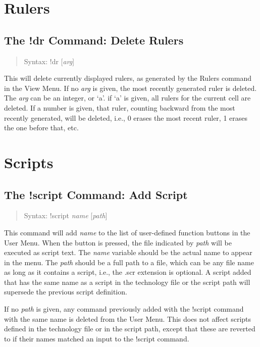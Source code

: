 \section{Rulers}

\subsection{The {\cb !dr} Command: Delete Rulers}
\begin{quote}
Syntax: {\vt !dr} [{\it arg\/}]
\end{quote}
This will delete currently displayed rulers, as generated by the {\cb
Rulers} command in the {\cb View Menu}.  If no {\it arg} is given, the
most recently generated ruler is deleted.  The {\it arg} can be an
integer, or `{\vt a}'.  if `{\vt a}' is given, all rulers for the
current cell are deleted.  If a number is given, that ruler, counting
backward from the most recently generated, will be deleted, i.e., 0
erases the most recent ruler, 1 erases the one before that, etc.


\section{Scripts}

\subsection{The {\cb !script} Command: Add Script}
\begin{quote}
Syntax: {\vt !script} {\it name} [{\it path\/}]
\end{quote}
This command will add {\it name} to the list of user-defined function
buttons in the {\cb User Menu}.  When the button is pressed, the file
indicated by {\it path} will be executed as script text.  The {\it
name} variable should be the actual name to appear in the menu.  The
{\it path} should be a full path to a file, which can be any file name
as long as it contains a script, i.e., the {\vt .scr} extension is
optional.  A script added that has the same name as a script in the
technology file or the script path will supersede the previous script
definition.

If no {\it path} is given, any command previously added with the {\cb
!script} command with the same name is deleted from the {\cb User
Menu}.  This does not affect scripts defined in the technology file or
in the script path, except that these are reverted to if their names
matched an input to the {\cb !script} command.

